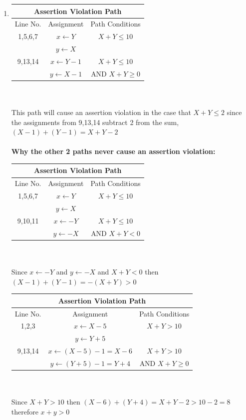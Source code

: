 \documentclass[a4paper,12pt]{article}
\begin{document}
\begin{enumerate}
\begin{enumerate}
				\item 	\begin{tabular}{|c|c|c|}
					\hline
					\multicolumn{3}{|c|}{Assertion Violation Path} \\
					\hline
					Line No. & Assignment & Path Conditions \\
					\hline
					1,5,6,7   & $x\leftarrow Y$ & $X+Y \le
					 10$ \\
					~ & $y\leftarrow X$ & ~   \\
					\hline
					9,13,14  & $x\leftarrow Y-1$ & $X+Y \le 10$ \\
					~ & $y\leftarrow X-1$ & AND $ X + Y \ge 0$   \\
					\hline
				\end{tabular} ~\\\\
			This path will cause an assertion violation in the case that $X+Y \le 2$ since the assignments from 9,13,14 subtract 2 from the sum, $(X-1) + (Y-1) = X + Y - 2$\\\\
			
			\textbf{Why the other 2 paths never cause an assertion violation:}\\
			\begin{tabular}{|c|c|c|}
				\hline
				\multicolumn{3}{|c|}{Assertion Violation Path} \\
				\hline
				Line No. & Assignment & Path Conditions \\
				\hline
				1,5,6,7   & $x\leftarrow Y$ & $X+Y \le
				10$ \\
				~ & $y\leftarrow X$ & ~   \\
				\hline
				9,10,11  & $x\leftarrow -Y$ & $X+Y \le 10$ \\
				~ & $y\leftarrow -X$ & AND $ X + Y < 0$   \\
				\hline
			\end{tabular} ~\\\\
			Since  $x\leftarrow -Y$ and $y\leftarrow -X$ and $X+Y<0$ then $(X-1) + (Y-1) = -(X+Y) > 0$
		
			\begin{tabular}{|c|c|c|}
				\hline
				\multicolumn{3}{|c|}{Assertion Violation Path} \\
				\hline
				Line No. & Assignment & Path Conditions \\
				\hline
				1,2,3   & $x\leftarrow X-5$ & $X+Y >
				10$ \\
				~ & $y\leftarrow Y+5$ & ~   \\
				\hline
				9,13,14  & $x\leftarrow (X-5)-1=X-6$ & $X+Y > 10$ \\
				~ & $y\leftarrow (Y+5)-1=Y+4$ & AND $ X + Y \ge 0$   \\
				\hline
			\end{tabular} ~\\\\
			Since $X+Y>10$ then $(X-6) + (Y+4) = X+Y-2 > 10-2 = 8$ therefore $x+y > 0$
		

\end{enumerate}
\end{enumerate}
\end{document}
